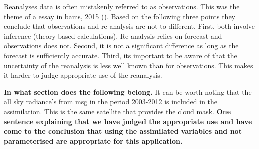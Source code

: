 Reanalyses data is often mistakenly referred to as observations. This was the theme of a essay in \acrfull{bams}, 2015 (\cite{Parker2016ReanalysesDifference}). Based on the following three points they conclude that observations and re-analysis are not to different. First, both involve inference (theory based calculations). Re-analysis relies on forecast and observations does not. Second, it is not a significant difference as long as the forecast is sufficiently accurate. Third, its important to be aware of that the uncertainty of the reanalysis is less well known than for observations. This makes it harder to judge appropriate use of the reanalysis. 

\textbf{In what section does the following belong.}
It can be worth noting that the all sky radiance's from \acrfull{msg} in the period 2003-2012 is included in the assimilation. This is the same satellite that provides the cloud mask. 
\textbf{One sentence explaining that we have judged the appropriate use and have come to the conclusion that using the assimilated variables and not parameterised are appropriate for this application.}

